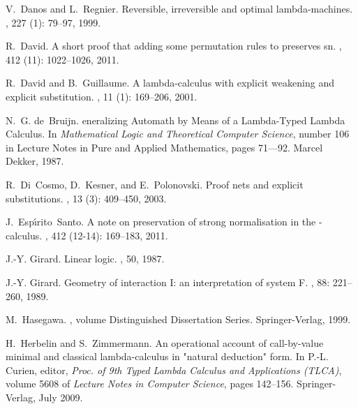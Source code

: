 \documentclass{LMCS}
\renewcommand{\>}{\rightarrow}
\begin{document}
\begin{thebibliography}{10}
V.~Danos and L.~Regnier.
\newblock Reversible, irreversible and optimal lambda-machines.
, 227 (1):
  79--97, 1999.

R.~David.
\newblock A short proof that adding some permutation rules to preserves sn.
, 412 (11): 1022--1026,
  2011.

R.~David and B.~Guillaume.
\newblock A lambda-calculus with explicit weakening and explicit substitution.
, 11
  (1): 169--206, 2001.

N.~G. de~Bruijn.
eneralizing {A}utomath by {M}eans of a {L}ambda-{T}yped {L}ambda
  {C}alculus.
\newblock In {\em Mathematical Logic and Theoretical Computer Science}, number
  106 in Lecture Notes in Pure and Applied Mathematics, pages 71–--92. Marcel
  Dekker, 1987.

R.~Di~Cosmo, D.~Kesner, and E.~Polonovski.
\newblock Proof nets and explicit substitutions.
, 13
  (3): 409--450, 2003.

J.~Esp\'{\i}rito~Santo.
\newblock A note on preservation of strong normalisation in the
  -calculus.
, 412 (12-14):
  169--183, 2011.

J.-Y. Girard.
\newblock Linear logic.
, 50, 1987.

J.-Y. Girard.
\newblock Geometry of interaction {I}: an interpretation of system {F}.
, 88: 221--260, 1989.

M.~Hasegawa.
, volume Distinguished Dissertation Series.
\newblock Springer-Verlag, 1999.

H.~Herbelin and S.~Zimmermann.
\newblock An operational account of call-by-value minimal and classical
  lambda-calculus in "natural deduction" form.
\newblock In P.-L. Curien, editor, {\em Proc. of 9th Typed Lambda Calculus and
  Applications (TLCA)}, volume 5608 of {\em Lecture Notes in Computer Science},
  pages 142--156. Springer-Verlag, July 2009.


\end{thebibliography}
\end{document}
